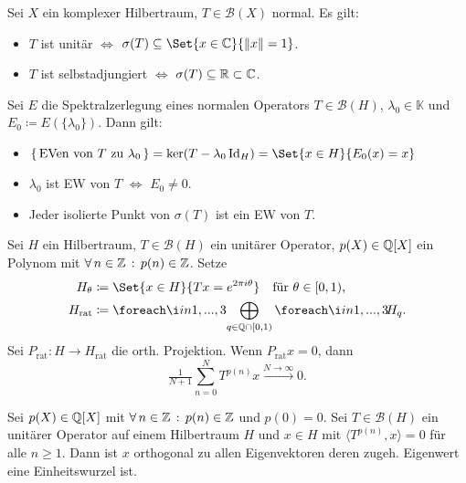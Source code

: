 \documentclass{cheat-sheet}
\newcommand{\K}{\mathbb{K}} %
\newcommand{\nspace}[1]{\foreach \i in {1,...,#1}{ \! }} %
\newcommand{\Boun}{\mathcal{B}} %
\newcommand{\scp}[2]{\langle #1 , #2 \rangle} %
\begin{document}
\begin{thm}
  Sei $X$ ein komplexer Hilbertraum, $T \!\in\! \Boun(X)$ normal. Es gilt:
  \begin{itemize}
    \item $T$ ist unitär $\iff$ $\sigma(T) \subseteq \Set{x \in \C}{\norm{x} = 1}$.
    \item $T$ ist selbstadjungiert $\iff$ $\sigma(T) \subseteq \mathbb{R} \subset \mathbb{C}$.
  \end{itemize}
\end{thm}

\begin{thm}
  Sei $E$ die Spektralzerlegung eines normalen Operators $T \in \Boun(H)$, $\lambda_0 \in \K$ und $E_0 \coloneqq E(\{ \lambda_0 \})$. Dann gilt:
  \begin{itemize}
    \item $\{\, \text{EVen von $T$ zu $\lambda_0$} \,\} = \ker (T - \lambda_0 \Id_H) = \Set{x \in H}{E_0(x) = x}$
    \item $\lambda_0$ ist EW von $T$ $\iff$ $E_0 \neq 0$.
    \item Jeder isolierte Punkt von $\sigma(T)$ ist ein EW von $T$.
  \end{itemize}
\end{thm}

\begin{lem}
  Sei $H$ ein Hilbertraum, $T \in \Boun(H)$ ein unitärer Operator, $p(X) \in \mathbb{Q}[X]$ ein Polynom mit $\forall \, {n \in \mathbb{Z}} \,:\, p(n) \in \mathbb{Z}$. Setze
  \begin{align*}
    H_\theta & \coloneqq \Set{x \in H}{Tx = e^{2 \pi i \theta}} \quad
    \text{für $\theta \in \cointerval{0}{1}$,} \\
    H_{\text{rat}} & \coloneqq \nspace{3} \bigoplus_{q \in \Q \cap \cointerval{0}{1}} \nspace{3} H_q.
  \end{align*}
  Sei $P_{\text{rat}} : H \to H_{\text{rat}}$ die orth. Projektion. Wenn $P_{\text{rat}} x = 0$, dann
  \[ \tfrac{1}{N + 1} \sum_{n=0}^N T^{p(n)} x \xrightarrow{N \to \infty} 0. \]
\end{lem}

\begin{prop}
  Sei $p(X) \in \mathbb{Q}[X]$ mit $\forall \, {n \in \mathbb{Z}} \,:\, p(n) \in \mathbb{Z}$ und $p(0) = 0$.
  Sei $T \in \Boun(H)$ ein unitärer Operator auf einem Hilbertraum $H$ und $x \in H$ mit $\scp{T^{p(n)}}{x} = 0$ für alle $n \geq 1$. Dann ist $x$ orthogonal zu allen Eigenvektoren deren zugeh. Eigenwert eine Einheitswurzel ist.
\end{prop}
\end{document}
